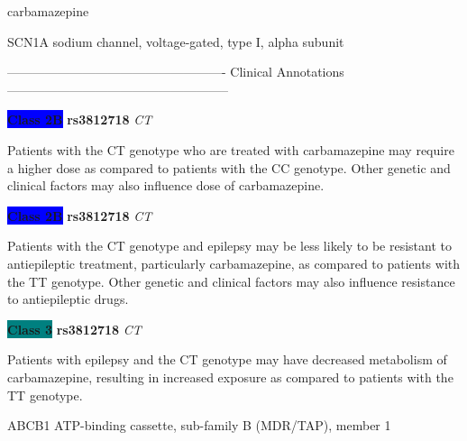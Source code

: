 \documentclass{resume} %
\begin{document}
\begin{rSection}{ carbamazepine }
\begin{rSubsection}{ SCN1A }{ sodium channel, voltage-gated, type I, alpha subunit }{}{}
\item[] ---------------------------------------------------- Clinical Annotations -----------------------------------------------------\newline
\item \textbf{\colorbox{blue} {Class 2B}} \textbf{ rs3812718 } \textit{ CT }
\item[] Patients with the CT genotype who are treated with carbamazepine may require a higher dose as compared to patients with the CC genotype. Other genetic and clinical factors may also influence dose of carbamazepine.\item \textbf{\colorbox{blue} {Class 2B}} \textbf{ rs3812718 } \textit{ CT }
\item[] Patients with the CT genotype and epilepsy may be less likely to be resistant to antiepileptic treatment, particularly carbamazepine, as compared to patients with the TT genotype. Other genetic and clinical factors may also influence resistance to antiepileptic drugs.\item \textbf{\colorbox{teal} {Class 3}} \textbf{ rs3812718 } \textit{ CT }
\item[] Patients with epilepsy and the CT genotype may have decreased metabolism of carbamazepine, resulting in increased exposure as compared to patients with the TT genotype. 
\end{rSubsection}\begin{rSubsection}{ ABCB1 }{ ATP-binding cassette, sub-family B (MDR/TAP), member 1 }{}{}
\item[]


\end{rSubsection}
\end{rSection}
\end{document}
